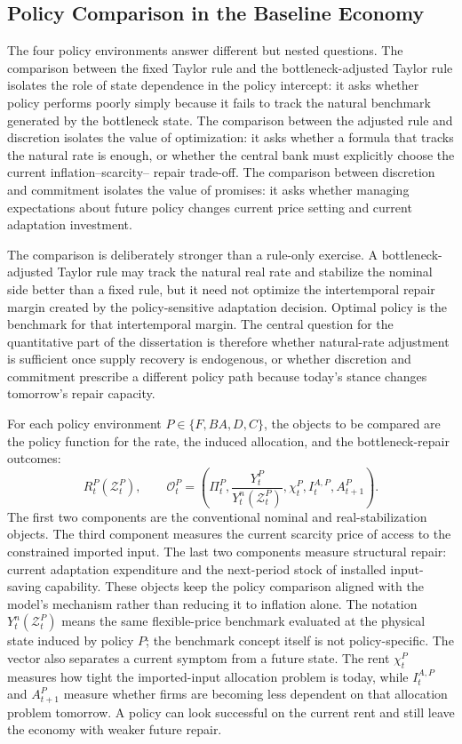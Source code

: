 ﻿\documentclass[12pt]{article}
\theoremstyle{remark}
\begin{document}
\subsection{Policy Comparison in the Baseline Economy}

The four policy environments answer different but nested questions. The comparison between the
fixed Taylor rule and the bottleneck-adjusted Taylor rule isolates the role of state dependence in
the policy intercept: it asks whether policy performs poorly simply because it fails to track the
natural benchmark generated by the bottleneck state. The comparison between the adjusted rule and
discretion isolates the value of optimization: it asks whether a formula that tracks the natural
rate is enough, or whether the central bank must explicitly choose the current inflation--scarcity--
repair trade-off. The comparison between discretion and commitment isolates the value of promises:
it asks whether managing expectations about future policy changes current price setting and current
adaptation investment.

The comparison is deliberately stronger than a rule-only exercise. A bottleneck-adjusted Taylor
rule may track the natural real rate and stabilize the nominal side better than a fixed rule, but
it need not optimize the intertemporal repair margin created by the policy-sensitive adaptation
decision. Optimal policy is the benchmark for that intertemporal margin. The central
question for the quantitative part of the dissertation is therefore whether natural-rate adjustment
is sufficient once supply recovery is endogenous, or whether discretion and commitment prescribe a
different policy path because today's stance changes tomorrow's repair capacity.

For each policy environment $P\in\{F,BA,D,C\}$, the objects to be compared are the policy function
for the rate, the induced allocation, and the bottleneck-repair outcomes:
\begin{equation}
    R_t^P(\mathcal Z_t^P),
    \qquad
    \mathcal O_t^P
    =
    \left(
        \Pi_t^P,
        \frac{Y_t^P}{Y_t^n(\mathcal Z_t^P)},
        \chi_t^P,
        I_t^{A,P},
        A_{t+1}^P
    \right).
    \label{eq:policy_comparison_outcomes}
\end{equation}
The first two components are the conventional nominal and real-stabilization objects. The third
component measures the current scarcity price of access to the constrained imported input. The last
two components measure structural repair: current adaptation expenditure and the next-period stock
of installed input-saving capability. These objects keep the policy comparison aligned with the
model's mechanism rather than reducing it to inflation alone. The notation
$Y_t^n(\mathcal Z_t^P)$ means the same flexible-price benchmark evaluated at the physical state
induced by policy $P$; the benchmark concept itself is not policy-specific.
The vector also separates a current symptom from a future state. The rent $\chi_t^P$ measures how
tight the imported-input allocation problem is today, while $I_t^{A,P}$ and $A_{t+1}^P$ measure
whether firms are becoming less dependent on that allocation problem tomorrow. A policy can look
successful on the current rent and still leave the economy with weaker future repair.
\end{document}

